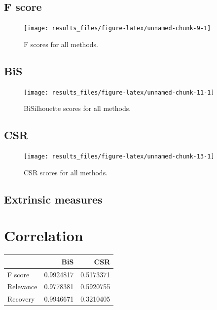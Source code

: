 \documentclass[
]{article}
\begin{document}
\hypertarget{f-score}{%
\subsection{F score}\label{f-score}}

\begin{figure}[H]

{\centering \texttt{[image: results\_files/figure-latex/unnamed-chunk-9-1]} 

}

\caption{F scores for all methods.}\label{fig:unnamed-chunk-9}
\end{figure}

\hypertarget{bis}{%
\subsection{BiS}\label{bis}}

\begin{figure}[H]

{\centering \texttt{[image: results\_files/figure-latex/unnamed-chunk-11-1]} 

}

\caption{BiSilhouette scores for all methods.}\label{fig:unnamed-chunk-11}
\end{figure}

\hypertarget{csr}{%
\subsection{CSR}\label{csr}}

\begin{figure}[H]

{\centering \texttt{[image: results\_files/figure-latex/unnamed-chunk-13-1]} 

}

\caption{CSR scores for all methods.}\label{fig:unnamed-chunk-13}
\end{figure}

\hypertarget{extrinsic-measures}{%
\subsection{Extrinsic measures}\label{extrinsic-measures}}

\hypertarget{correlation}{%
\section{Correlation}\label{correlation}}

\begin{tabular}[t]{lrr}
\toprule
  & BiS & CSR\\
\midrule
F score & 0.9924817 & 0.5173371\\
Relevance & 0.9778381 & 0.5920755\\
Recovery & 0.9946671 & 0.3210405\\
\bottomrule
\end{tabular}
\end{document}
